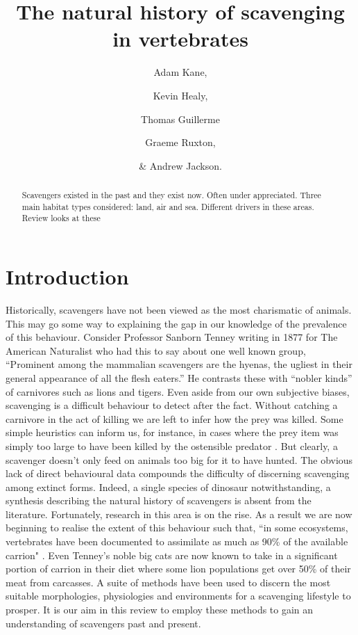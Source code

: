 \documentclass[a4paper,12pt]{article}
\title{The natural history of scavenging in vertebrates}
\author{Adam Kane, \and Kevin Healy, \and Thomas Guillerme \and Graeme Ruxton, \and \& Andrew Jackson.}
\begin{document}
\maketitle


\begin{abstract}
  Scavengers existed in the past and they exist now. 
  Often under appreciated. 
  Three main habitat types considered: land, air and sea. 
  Different drivers in these areas. 
  Review looks at these 
\end{abstract}


\newpage


\section*{Introduction}
Historically, scavengers have not been viewed as the most charismatic of animals. This may go some way to explaining the gap in our knowledge of the prevalence of this behaviour. Consider Professor Sanborn Tenney writing in 1877 for The American Naturalist who had this to say about one well known group, “Prominent among the mammalian scavengers are the hyenas, the ugliest in their general appearance of all the flesh eaters.” He contrasts these with “nobler kinds” of carnivores such as lions and tigers. Even aside from our own subjective biases, scavenging is a difficult behaviour to detect after the fact. Without catching a carnivore in the act of killing we are left to infer how the prey was killed. Some simple heuristics can inform us, for instance, in cases where the prey item was simply too large to have been killed by the ostensible predator \citep{pobiner2008paleoecological}. But clearly, a scavenger doesn’t only feed on animals too big for it to have hunted. The obvious lack of direct behavioural data compounds the difficulty of discerning scavenging among extinct forms. Indeed, a single species of dinosaur notwithstanding, a synthesis describing the natural history of scavengers is absent from the literature. Fortunately, research in this area is on the rise. As a result we are now beginning to realise the extent of this behaviour such that, “in some ecosystems, vertebrates have been documented to assimilate as much as 90\% of the available carrion" \citep{benbow2015introduction}. Even Tenney’s noble big cats are now known to take in a significant portion of carrion in their diet where some lion populations get over 50\% of their meat from carcasses. A suite of methods have been used to discern the most suitable morphologies, physiologies and environments for a scavenging lifestyle to prosper. It is our aim in this review to employ these methods to gain an understanding of scavengers past and present. 
\end{document}
